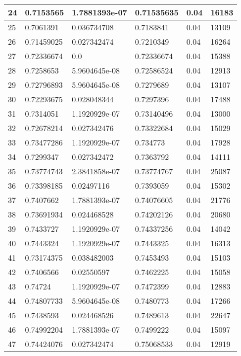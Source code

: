\begin{longtable}{|l|l|l|l|l|l|}
24 & 0.7153565 & 1.7881393e-07 & 0.71535635 & 0.04 & 16183 \\ \hline 
25 & 0.7061391 & 0.036734708 & 0.7183841 & 0.04 & 13109 \\ \hline 
26 & 0.71459025 & 0.027342474 & 0.7210349 & 0.04 & 16264 \\ \hline 
27 & 0.72336674 & 0.0 & 0.72336674 & 0.04 & 15388 \\ \hline 
28 & 0.7258653 & 5.9604645e-08 & 0.72586524 & 0.04 & 12913 \\ \hline 
29 & 0.72796893 & 5.9604645e-08 & 0.7279689 & 0.04 & 13107 \\ \hline 
30 & 0.72293675 & 0.028048344 & 0.7297396 & 0.04 & 17488 \\ \hline 
31 & 0.7314051 & 1.1920929e-07 & 0.73140496 & 0.04 & 13000 \\ \hline 
32 & 0.72678214 & 0.027342476 & 0.73322684 & 0.04 & 15029 \\ \hline 
33 & 0.73477286 & 1.1920929e-07 & 0.734773 & 0.04 & 17928 \\ \hline 
34 & 0.7299347 & 0.027342472 & 0.7363792 & 0.04 & 14111 \\ \hline 
35 & 0.73774743 & 2.3841858e-07 & 0.73774767 & 0.04 & 25087 \\ \hline 
36 & 0.73398185 & 0.02497116 & 0.7393059 & 0.04 & 15302 \\ \hline 
37 & 0.7407662 & 1.7881393e-07 & 0.74076605 & 0.04 & 21776 \\ \hline 
38 & 0.73691934 & 0.024468528 & 0.74202126 & 0.04 & 20680 \\ \hline 
39 & 0.7433727 & 1.1920929e-07 & 0.74337256 & 0.04 & 14042 \\ \hline 
40 & 0.7443324 & 1.1920929e-07 & 0.7443325 & 0.04 & 16313 \\ \hline 
41 & 0.73174375 & 0.038482003 & 0.7453493 & 0.04 & 15103 \\ \hline 
42 & 0.7406566 & 0.02550597 & 0.7462225 & 0.04 & 15058 \\ \hline 
43 & 0.74724 & 1.1920929e-07 & 0.7472399 & 0.04 & 12883 \\ \hline 
44 & 0.74807733 & 5.9604645e-08 & 0.7480773 & 0.04 & 17266 \\ \hline 
45 & 0.7438593 & 0.024468526 & 0.7489613 & 0.04 & 22647 \\ \hline 
46 & 0.74992204 & 1.7881393e-07 & 0.7499222 & 0.04 & 15097 \\ \hline 
47 & 0.74424076 & 0.027342474 & 0.75068533 & 0.04 & 12919 \\ \hline 

\end{longtable}
